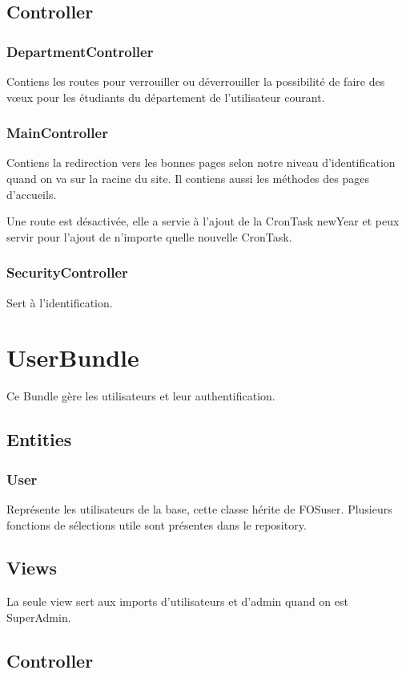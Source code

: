 \subsection{Controller}
\subsubsection{DepartmentController}
Contiens les routes pour verrouiller ou déverrouiller la possibilité de faire des vœux pour les étudiants du département de l'utilisateur courant.

\subsubsection{MainController}
Contiens la redirection vers les bonnes pages selon notre niveau d'identification quand on va sur la racine du site.
Il contiens aussi les méthodes des pages d'accueils.

Une route est désactivée, elle a servie à l'ajout de la CronTask newYear et peux servir pour l'ajout de n'importe quelle nouvelle CronTask.

\subsubsection{SecurityController}
Sert à l'identification.

\section{UserBundle}
Ce Bundle gère les utilisateurs et leur authentification.

\subsection{Entities}
\subsubsection{User}
Représente les utilisateurs de la base, cette classe hérite de FOSuser. Plusieurs fonctions de sélections utile sont présentes dans le repository.

\subsection{Views}
La seule view sert aux imports d'utilisateurs et d'admin quand on est SuperAdmin.

\subsection{Controller}
